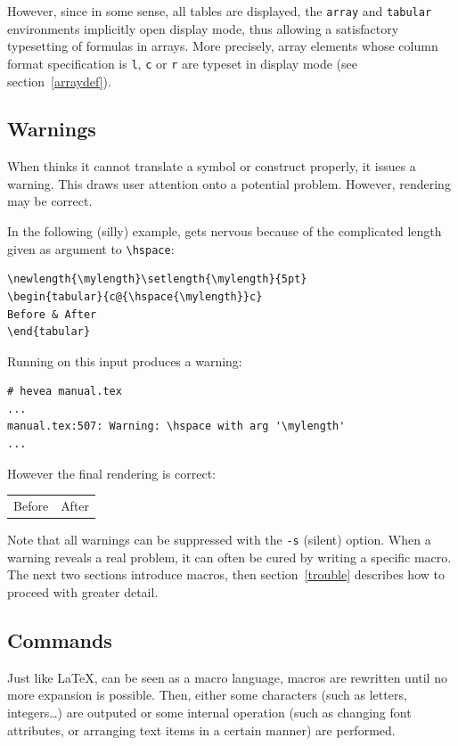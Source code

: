 However, since in some sense, all \html{} tables are displayed, the
\verb+array+ and \verb+tabular+ environments implicitly open display
mode, thus allowing a satisfactory typesetting of formulas in
arrays. More precisely, array elements whose column format
specification is \verb+l+, \verb+c+ or \verb+r+ are typeset in display
mode (see section~\ref{arraydef}).


\subsection{Warnings}
When \hevea{} thinks it cannot translate a symbol or construct
properly, it issues a warning. This draws user attention onto a
potential problem. However, rendering may be correct.

\begin{htmlonly}
In the following (silly) example, \hevea{} gets nervous  because of
the complicated length given as argument to \verb+\hspace+:
\begin{verbatim}
\newlength{\mylength}\setlength{\mylength}{5pt}
\begin{tabular}{c@{\hspace{\mylength}}c}
Before & After
\end{tabular}
\end{verbatim}
Running \hevea{} on this input produces a warning:
\begin{verbatim}
# hevea manual.tex
...
manual.tex:507: Warning: \hspace with arg '\mylength'
...
\end{verbatim}
However the final rendering is correct:
\begin{htmlout}
\newlength{\mylength}\setlength{\mylength}{5pt}%
\begin{tabular}{c@{\hspace{\mylength}}c}
Before & After
\end{tabular}
\end{htmlout}
\end{htmlonly}

Note that all warnings can be suppressed with the \verb+-s+ (silent)
option.
When a warning reveals a real problem, it can often be cured by
writing a specific macro. The next two sections introduce \hevea{}
macros, then section~\ref{trouble} describes how to proceed with
greater detail.

\subsection{Commands}
Just like \LaTeX{}, \hevea{} can be seen as a macro language, macros
are rewritten until no more expansion is possible. Then, either some
characters (such as letters, integers\ldots) are outputed or some
internal operation (such as changing font attributes, or arranging
text items in a certain manner) are performed.

